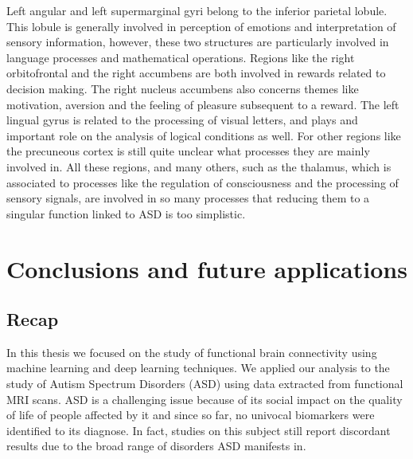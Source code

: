 \documentclass[11pt]{report}
\begin{document}
Left angular and left supermarginal gyri belong to the inferior parietal lobule.
This lobule is generally involved in perception of emotions and interpretation of sensory information, however, these two structures are particularly involved in language processes and mathematical operations.
Regions like the right orbitofrontal and the right accumbens are both involved in rewards related to decision making.
The right nucleus accumbens also concerns themes like motivation, aversion and the feeling of pleasure subsequent to a reward.
The left lingual gyrus is related to the processing of visual letters, and plays and important role on the analysis of logical conditions as well.
For other regions like the precuneous cortex is still quite unclear what processes they are mainly involved in.
All these regions, and many others, such as the thalamus, which is associated to processes like the regulation of consciousness and the processing of sensory signals, are involved in so many processes that reducing them to a singular function linked to ASD is too simplistic.



\chapter{Conclusions and future applications}

\section*{Recap}

In this thesis we focused on the study of functional brain connectivity using machine learning and deep learning techniques.
We applied our analysis to the study of Autism Spectrum Disorders (ASD) using data extracted from functional MRI scans.
ASD is a challenging issue because of its social impact on the quality of life of people affected by it and since so far, no univocal biomarkers were identified to its diagnose.
In fact, studies on this subject still report discordant results due to the broad range of disorders ASD manifests in.
\end{document}
